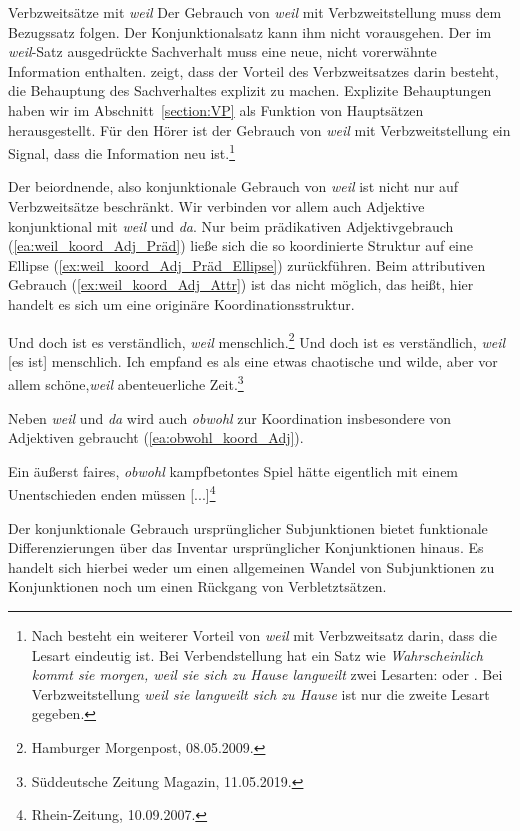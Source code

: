 \begin{Exkurs}{Verbzweitsätze mit \textit{weil}}
Der Gebrauch von \textit{weil} mit Verbzweitstellung muss dem Bezugssatz folgen. Der Konjunktionalsatz kann ihm nicht vorausgehen. Der im \textit{weil}-Satz ausgedrückte Sachverhalt muss eine neue, nicht vorerwähnte Information enthalten. \citet[265]{Pasch1997} zeigt, dass der Vorteil des Verbzweitsatzes darin besteht, die Behauptung des Sachverhaltes explizit zu machen. Explizite Behauptungen haben wir im Abschnitt~\ref{section:VP} als Funktion von Hauptsätzen herausgestellt. Für den Hörer ist der Gebrauch von \textit{weil} mit Verbzweitstellung ein Signal, dass die Information neu ist.\footnote{Nach \citet[265]{Pasch1997} besteht ein weiterer Vorteil von \textit{weil} mit Verbzweitsatz darin, dass die Lesart eindeutig ist. Bei Verbendstellung hat ein Satz wie \textit{Wahrscheinlich kommt sie morgen, weil sie sich zu Hause langweilt} zwei Lesarten:  oder . Bei Verbzweitstellung \textit{weil sie langweilt sich zu Hause} ist nur die zweite Lesart gegeben.}

Der beiordnende, also konjunktionale Gebrauch von \textit{weil} ist nicht nur auf Verbzweitsätze beschränkt. Wir verbinden vor allem auch Adjektive konjunktional mit \textit{weil} und \textit{da}. Nur beim prädikativen Adjektivgebrauch (\ref{ea:weil_koord_Adj_Präd}) ließe sich die so koordinierte Struktur auf eine Ellipse (\ref{ex:weil_koord_Adj_Präd_Ellipse}) zurückführen. Beim attributiven Gebrauch (\ref{ex:weil_koord_Adj_Attr}) ist das nicht möglich, das heißt, hier handelt es sich um eine originäre Koordinationsstruktur.

\ea \label{ea:weil_koord_Adj}
\ea \label{ea:weil_koord_Adj_Präd} Und doch ist es verständlich, \textit{weil} menschlich.\footnote{Hamburger Morgenpost, 08.05.2009.}
\ex \label{ex:weil_koord_Adj_Präd_Ellipse} Und doch ist es verständlich, \textit{weil} [es ist] menschlich.
\ex \label{ex:weil_koord_Adj_Attr} Ich empfand es als eine etwas chaotische und wilde, aber vor allem schöne,\textit{weil} abenteuerliche Zeit.\footnote{Süddeutsche Zeitung Magazin, 11.05.2019.}
\z
\z 

Neben \textit{weil} und \textit{da} wird auch \textit{obwohl} zur Koordination insbesondere von Adjektiven gebraucht (\ref{ea:obwohl_koord_Adj}).

\ea \label{ea:obwohl_koord_Adj} Ein äußerst faires, \textit{obwohl} kampfbetontes Spiel hätte eigentlich mit einem Unentschieden enden müssen [...]\footnote{Rhein-Zeitung, 10.09.2007.}
\z 

Der konjunktionale Gebrauch ursprünglicher Subjunktionen bietet funktionale Differenzierungen über das Inventar ursprünglicher Konjunktionen hinaus. Es handelt sich hierbei weder um einen allgemeinen Wandel von Subjunktionen zu Konjunktionen noch um einen Rückgang von Verbletztsätzen.  

\end{Exkurs}


